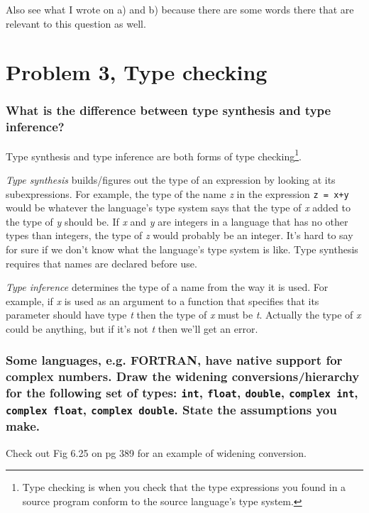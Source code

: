 Also see what I wrote on a) and b) because there are some words there that are relevant to this question as well.

\newpage
\setcounter{subsubsection}{0}
\section{Problem 3, Type checking}
\subsubsection{What is the difference between type synthesis and type inference?}
Type synthesis and type inference are both forms of type checking\footnote{Type checking is when you check that the type expressions you found in a source program conform to the source language's type system.}.

\emph{Type synthesis} builds/figures out the type of an expression by looking at its subexpressions.
For example, the type of the name \emph{z} in the expression \texttt{z = x+y} would be whatever the language's type system says that the type of \emph{x} added to the type of \emph{y} should be.
If \emph{x} and \emph{y} are integers in a language that has no other types than integers, the type of \emph{z} would probably be an integer.
It's hard to say for sure if we don't know what the language's type system is like.
Type synthesis requires that names are declared before use.

\emph{Type inference} determines the type of a name from the way it is used.
For example, if \emph{x} is used as an argument to a function that specifies that its parameter should have type \emph{t} then the type of \emph{x} must be \emph{t}.
Actually the type of \emph{x} could be anything, but if it's not \emph{t} then we'll get an error.

\subsubsection{Some languages, e.g. FORTRAN, have native support for complex numbers. Draw the widening conversions/hierarchy for the following set of types: \texttt{int}, \texttt{float}, \texttt{double}, \texttt{complex int}, \texttt{complex float}, \texttt{complex double}. State the assumptions you make.}

Check out Fig 6.25 on pg 389 for an example of widening conversion.

\newpage
\setcounter{subsubsection}{0}
